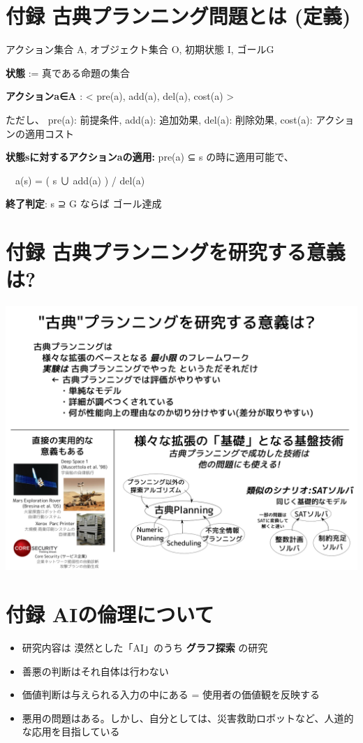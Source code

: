 \section{付録 古典プランニング問題とは (定義)}
\label{sec-8}

アクション集合 A, オブジェクト集合 O, 初期状態 I, ゴールG

\textbf{状態} := 真である命題の集合

\textbf{アクションa∈A} : < pre(a), add(a), del(a), cost(a) >

ただし、 pre(a): 前提条件, add(a): 追加効果, del(a): 削除効果, cost(a): アクションの適用コスト

\textbf{状態sに対するアクションaの適用:} pre(a) ⊆ s の時に適用可能で、

　a(s) = ( s ∪ add(a) ) / del(a)

\textbf{終了判定}: s ⊇ G ならば ゴール達成

\section{付録 古典プランニングを研究する意義は?}
\label{sec-9}

\includegraphics{img/classical-meaning.png}

\section{付録 AIの倫理について}
\label{sec-10}

\begin{itemize}
\item 研究内容は 漠然とした「AI」のうち \textbf{グラフ探索} の研究
\item 善悪の判断はそれ自体は行わない
\item 価値判断は与えられる入力の中にある = 使用者の価値観を反映する
\item 悪用の問題はある。しかし、自分としては、災害救助ロボットなど、人道的な応用を目指している
\end{itemize}

